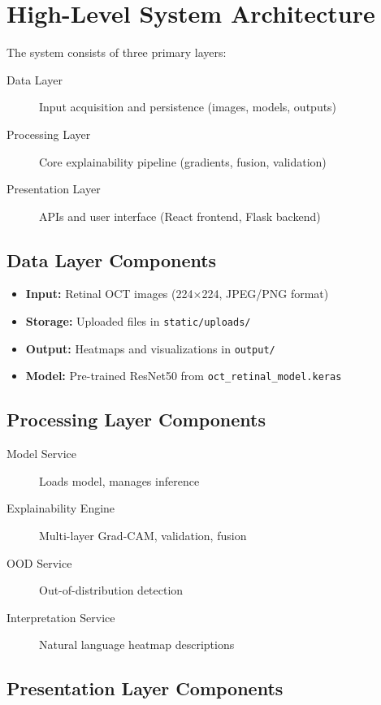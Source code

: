 \documentclass[12pt,a4paper,oneside]{book}
\begin{document}
\section{High-Level System Architecture}

The system consists of three primary layers:

\begin{description}
  \item[Data Layer] Input acquisition and persistence (images, models, outputs)
  \item[Processing Layer] Core explainability pipeline (gradients, fusion, validation)
  \item[Presentation Layer] APIs and user interface (React frontend, Flask backend)
\end{description}

\subsection{Data Layer Components}

\begin{itemize}
  \item \textbf{Input:} Retinal OCT images (224×224, JPEG/PNG format)
  \item \textbf{Storage:} Uploaded files in \texttt{static/uploads/}
  \item \textbf{Output:} Heatmaps and visualizations in \texttt{output/}
  \item \textbf{Model:} Pre-trained ResNet50 from \texttt{oct\_retinal\_model.keras}
\end{itemize}

\subsection{Processing Layer Components}

\begin{description}
  \item[Model Service] Loads model, manages inference
  \item[Explainability Engine] Multi-layer Grad-CAM, validation, fusion
  \item[OOD Service] Out-of-distribution detection
  \item[Interpretation Service] Natural language heatmap descriptions
\end{description}

\subsection{Presentation Layer Components}
\end{document}
